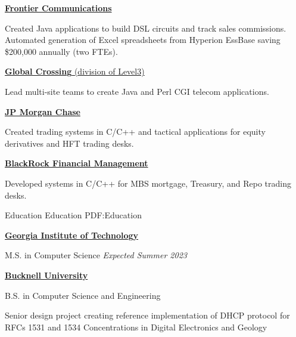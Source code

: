 \documentclass[letterpaper,MMMMyyyy,nonstopmode]{simpleresumecv}
\newcommand{\comment}[1]{\ignorespaces} %
\newif\ifLOCATION
\begin{document}
\begin{Body}
\BigGap
\Entry
\href{http://www.frontier.com/}
{\textbf{Frontier Communications}}

\begin{Detail}
\BulletItem
Created Java applications to build DSL circuits and track sales commissions\comment{; CruiseControl used for Continuous Integration}.  Automated generation of \comment{20} Excel spreadsheets from Hyperion EssBase saving \$200,000 annually (two FTEs).
\end{Detail}

\BigGap
\Entry
\href{http://www.globalcrossing.com/}
{\textbf{Global  Crossing} (division of Level3)}

\begin{Detail}
\BulletItem
Lead multi-site teams to create Java and Perl CGI telecom applications.
\end{Detail}

\BigGap
\Entry
\href{http://www.jpmorganchase.com/}
{\textbf{JP Morgan Chase}}
\begin{Detail}
\BulletItem
Created trading systems in C/C++ and tactical applications for equity derivatives and HFT trading desks.
\end{Detail}

\BigGap
\Entry
\href{http://www.blackrock.com/}
{\textbf{BlackRock Financial Management}}
\begin{Detail}
\BulletItem
Developed systems in C/C++ for MBS mortgage, Treasury, and Repo trading desks.
\end{Detail}
\fi %
%

\Section
{Education}
{Education}
{PDF:Education}

\Entry
\href{https://gatech.edu}
{\textbf{Georgia Institute of Technology}}

M.S. in Computer Science
\hfill 
\textit{Expected Summer 2023}


\Gap

\Entry
\href{http://www.bucknell.edu/}
{\textbf{Bucknell University}}
\ifLOCATION
\hfill Lewisburg, Pennsylvania
\fi

B.S. in Computer Science and Engineering
\iffalse
\hfill
\DatestampYM{1988}{09} --
\DatestampYM{1992}{06}
\fi
\iffalse
\begin{Detail}
\BulletItem
Senior design project creating reference implementation of DHCP protocol for RFCs 1531 and 1534
\BulletItem
Concentrations in Digital Electronics and Geology


\end{Detail}
\end{Body}
\end{document}
